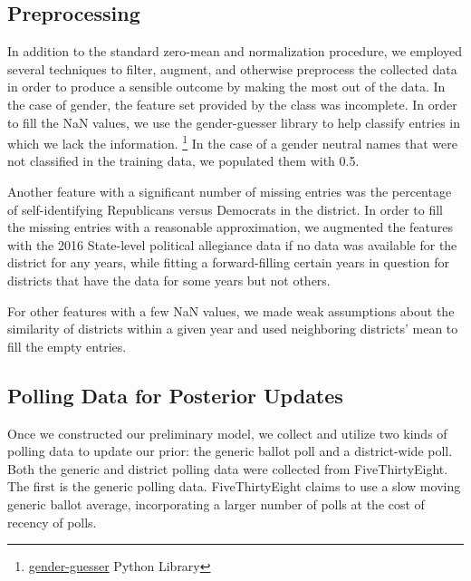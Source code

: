 \documentclass[11pt]{article}
\begin{document}
\subsection{Preprocessing}

In addition to the standard zero-mean and normalization procedure, we employed several techniques to filter, augment, and otherwise preprocess the collected data in order to produce a sensible outcome by making the most out of the data. In the case of gender, the feature set provided by the class was incomplete. In order to fill the NaN values, we use the gender-guesser library to help classify entries in which we lack the information. \footnote{\href{https://pypi.org/project/gender-guesser/}{gender-guesser} Python Library} In the case of a gender neutral names that were not classified in the training data, we populated them with 0.5.

Another feature with a significant number of missing entries was the percentage of self-identifying Republicans versus Democrats in the district. In order to fill the missing entries with a reasonable approximation, we augmented the features with the 2016 State-level political allegiance data if no data was available for the district for any years, while fitting a forward-filling certain years in question for districts that have the data for some years but not others.

For other features with a few NaN values, we made weak assumptions about the similarity of districts within a given year and used neighboring districts' mean to fill the empty entries. 

\subsection{Polling Data for Posterior Updates}
Once we constructed our preliminary model, we collect and utilize two kinds of polling data to update our prior: the generic ballot poll and a district-wide poll. Both the generic and district polling data were collected from FiveThirtyEight. The first is the generic polling data. FiveThirtyEight claims to use a slow moving generic ballot average, incorporating a larger number of polls at the cost of recency of polls.
\end{document}
